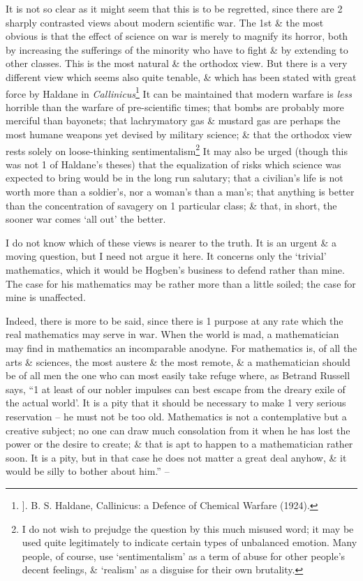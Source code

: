 \documentclass{article}
\numberwithin{equation}{section}
\begin{document}
It is not so clear as it might seem that this is to be regretted, since there are 2 sharply contrasted views about modern scientific war. The 1st \& the most obvious is that the effect of science on war is merely to magnify its horror, both by increasing the sufferings of the minority who have to fight \& by extending to other classes. This is the most natural \& the orthodox view. But there is a very different view which seems also quite tenable, \& which has been stated with great force by Haldane in \textit{Callinicus}\footnote{]. B. S. Haldane, Callinicus: a Defence of Chemical Warfare (1924).} It can be maintained that modern warfare is \textit{less} horrible than the warfare of pre-scientific times; that bombs are probably more merciful than bayonets; that lachrymatory gas \& mustard gas are perhaps the most humane weapons yet devised by military science; \& that the orthodox view rests solely on loose-thinking sentimentalism\footnote{I do not wish to prejudge the question by this much misused word; it may be used quite legitimately to indicate certain types of unbalanced emotion. Many people, of course, use `sentimentalism' as a term of abuse for other people's decent feelings, \& `realism' as a disguise for their own brutality.} It may also be urged (though this was not 1 of Haldane's theses) that the equalization of risks which science was expected to bring would be in the long run salutary; that a civilian's life is not worth more than a soldier's, nor a woman's than a man's; that anything is better than the concentration of savagery on 1 particular class; \& that, in short, the sooner war comes `all out' the better.

I do not know which of these views is nearer to the truth. It is an urgent \& a moving question, but I need not argue it here. It concerns only the `trivial' mathematics, which it would be Hogben's business to defend rather than mine. The case for his mathematics may be rather more than a little soiled; the case for mine is unaffected.

Indeed, there is more to be said, since there is 1 purpose at any rate which the real mathematics may serve in war. When the world is mad, a mathematician may find in mathematics an incomparable anodyne. For mathematics is, of all the arts \& sciences, the most austere \& the most remote, \& a mathematician should be of all men the one who can most easily take refuge where, as Betrand Russell says, ``1 at least of our nobler impulses can best escape from the dreary exile of the actual world'. It is a pity that it should be necessary to make 1 very serious reservation -- he must not be too old. Mathematics is not a contemplative but a creative subject; no one can draw much consolation from it when he has lost the power or the desire to create; \& that is apt to happen to a mathematician rather soon. It is a pity, but in that case he does not matter a great deal anyhow, \& it would be silly to bother about him.'' -- \cite[pp. 139--143]{Hardy1992}
\end{document}
